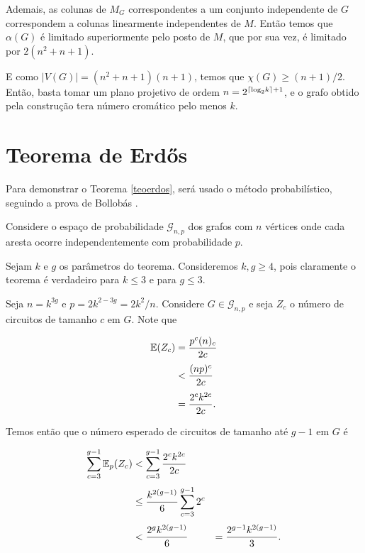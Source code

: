 Ademais, as colunas de $M_G$ correspondentes a um conjunto independente de $G$ correspondem a colunas linearmente independentes de $M$. Então temos que $\alpha(G)$ é limitado superiormente pelo posto de $M$, que por sua vez, é limitado por $2(n^2+n+1)$.

E como $|V(G)| = (n^2+n+1)(n+1)$, temos que $\chi(G) \geq (n+1)/2$. Então, basta tomar um plano projetivo de ordem $n = 2^{\ceil*{\text{log}_2 k}+1}$, e o grafo obtido pela construção tera número cromático pelo menos $k$.


\section{Teorema de Erd\H{o}s}

Para demonstrar o Teorema \ref{teoerdos}, será usado o método probabilístico, seguindo a prova de Bollobás \cite{bollobas2013modern}.

Considere o espaço de probabilidade $\mathcal{G}_{n,p}$ dos grafos com $n$ vértices onde cada aresta ocorre independentemente com probabilidade $p$.

Sejam $k$ e $g$ os parâmetros do teorema. Consideremos $k,g \geq 4$, pois claramente o teorema é verdadeiro para $k \leq 3$ e para $g \leq 3$. 

Seja $n = k^{3g}$ e $p = 2k^{2-3g} = 2k^2/n$. Considere $G \in\mathcal{G}_{n,p}$ e seja $Z_c$ o número de circuitos de tamanho $c$ em $G$. Note que

\begin{equation*}
\setlength{\jot}{6pt}
\begin{aligned}
\bbe(Z_c) &= \frac{p^c(n)_c}{2c} \\
&< \frac{(np)^c}{2c} \\
&= \frac{2^ck^{2c}}{2c}.
\end{aligned}
\end{equation*}

Temos então que o número esperado de circuitos de tamanho até $g-1$ em $G$ é

\begin{equation*}
\setlength{\jot}{6pt}
\begin{aligned}
\sum\limits_{c=3}^{g-1}\bbe_p(Z_c) &< \sum\limits_{c=3}^{g-1}\frac{2^ck^{2c}}{2c} \\
&\leq \frac{k^{2(g-1)}}{6}\sum\limits_{c=3}^{g-1}2^c \\
&< \frac{2^gk^{2(g-1)}}{6} &= \frac{2^{g-1}k^{2(g-1)}}{3}.
\end{aligned}
\end{equation*}


